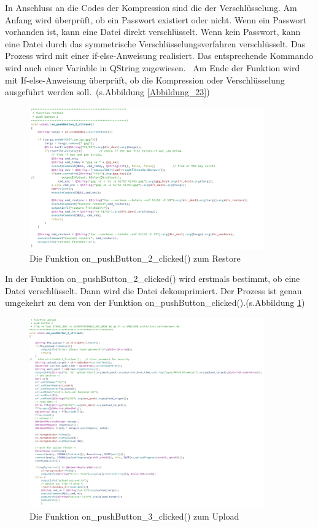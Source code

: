 In Anschluss an die Codes der Kompression sind die der Verschlüsselung. Am Anfang wird überprüft, ob ein Passwort existiert oder nicht. Wenn ein Passwort vorhanden ist, kann eine Datei direkt verschlüsselt. Wenn kein Passwort, kann eine Datei durch das symmetrische Verschlüsselungsverfahren verschlüsselt. Das Prozess wird mit einer if-else-Anweisung realisiert. Das entsprechende Kommando wird auch einer Variable in QString zugewiesen. 
Am Ende der Funktion wird mit If-else-Anweisung überprüft, ob die Kompression oder Verschlüsselung ausgeführt werden soll. (s.Abbildung \ref{Abbildung_23})

\begin{figure}[h!]
	\centering
	\includegraphics[width=0.9\textwidth]{bilder/code_restore.png}
	\caption{ Die Funktion on\_pushButton\_2\_clicked() zum Restore }
	\label{Abbildung_24}
\end{figure}

In der Funktion on\_pushButton\_2\_clicked() wird erstmals bestimmt, ob eine Datei verschlüsselt. Dann wird die Datei dekomprimiert. Der Prozess ist genau umgekehrt zu dem von der Funktion on\_pushButton\_clicked().(s.Abbildung \ref{Abbildung_24})

\begin{figure}[h!]
	\centering
	\includegraphics[width=0.9\textwidth]{bilder/code_upload.png}
	\caption{ Die Funktion on\_pushButton\_3\_clicked() zum Upload }
	\label{Abbildung_25}
\end{figure}

